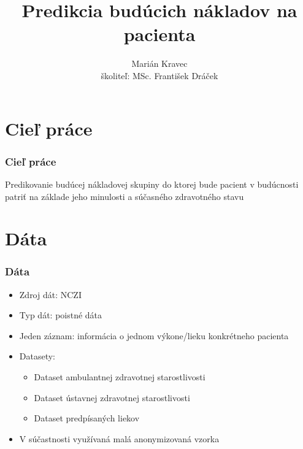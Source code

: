 \documentclass[slovak]{beamer}
\title[Predikcia budúcich nákladov na pacienta]{Predikcia budúcich nákladov na pacienta}
\author[]{Marián Kravec \\ školiteľ: MSc. František Dráček }
\date{}
\begin{document}
\begin{frame}
  \titlepage
\end{frame}




\section{Cieľ práce}

\begin{frame}
  \frametitle{Cieľ práce}
	Predikovanie budúcej nákladovej skupiny do ktorej bude pacient v budúcnosti patriť na základe jeho minulosti a súčasného zdravotného stavu 
\end{frame}


\section{Dáta}

\begin{frame}  
	\frametitle{Dáta}
	\begin{itemize}
		\item<1> Zdroj dát: NCZI
		\item<1> Typ dát: poistné dáta
		\item<1> Jeden záznam: informácia o jednom výkone/lieku konkrétneho pacienta
		\item<1> Datasety:
		\begin{itemize}
			\item<1> Dataset ambulantnej zdravotnej starostlivosti 
			\item<1> Dataset ústavnej zdravotnej starostlivosti
			\item<1> Dataset predpísaných liekov
		\end{itemize}
		\item<1> V súčastnosti využívaná malá anonymizovaná vzorka
	\end{itemize} 
\end{frame}
\end{document}
